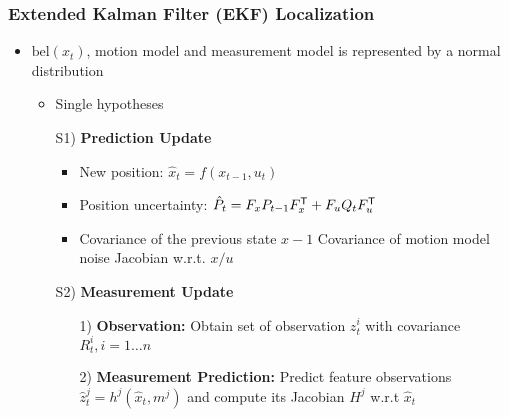 \subsubsection{Extended Kalman Filter (EKF) Localization}
\begin{itemize}
    \item $\text{bel}(x_t)$, motion model and measurement model is represented by a normal distribution
        \begin{itemize}
            \item Single hypotheses
        \end{itemize}
        \begin{itemize}
            \item[S1)] \textbf{Prediction Update}
                \begin{itemize}
                    \item New position: $\hat x_t = f(x_{t-1}, u_t)$
                    \item Position uncertainty: $\hat P_t = F_x P_{t-1} F_x^{\mathsf{T}} + F_u Q_t F_u^{\mathsf{T}}$
                    \item
                        \begin{itemize*}
                             Covariance of the previous state $x - 1$
                             Covariance of motion model noise
                             Jacobian w.r.t. $x/u$
                        \end{itemize*}
                \end{itemize}
            \item[S2)] \textbf{Measurement Update}
                \begin{itemize}
                    \item[1)] \textbf{Observation:} Obtain set of observation $z_t^i$ with covariance $R_t^i, i=1 \dots n$
                    \item[2)] \textbf{Measurement Prediction:} Predict feature observations $\hat z_t^j = h^j(\hat x_t, m^j)$ and compute its Jacobian $H^j$ w.r.t $\hat x_t$


\end{itemize}
\end{itemize}
\end{itemize}

